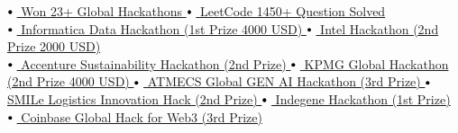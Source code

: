 \documentclass[letterpaper,10pt]{article}
\newcommand\sbullet[1][.5]{\mathbin{\vcenter{\hbox{\scalebox{#1}{$\bullet$}}}}}
\begin{document}
$\sbullet[.75] \hspace{0.1cm}${\href{https://www.hackerearth.com/@raj713335/}{ Won 23+ Global Hackathons \faExternalLink}} \hspace{4.4cm}
$\sbullet[.75] \hspace{0.1cm}${\href{https://leetcode.com/u/raj713335/}{ LeetCode 1450+ Question Solved \faExternalLink}} \\
$\sbullet[.75] \hspace{0.1cm}${\href{https://hack2skill.com/hack/informatica-deh-2024}{ Informatica Data Hackathon (1st Prize 4000 USD) \faExternalLink}} \hspace{1.05cm}
$\sbullet[.75] \hspace{0.1cm}${\href{https://www.hackerearth.com/challenges/hackathon/intel-oneapi-hackathon-for-open-innovation/}{ Intel Hackathon (2nd Prize 2000 USD) \faExternalLink}} \\
$\sbullet[.75] \hspace{0.1cm}${\href{https://www.hackerearth.com/challenges/hackathon/accenture-laterals-2/}{ Accenture Sustainability Hackathon (2nd Prize) \faExternalLink}} \hspace{1.5cm}
$\sbullet[.75] \hspace{0.1cm}${\href{https://www.hackerearth.com/challenges/hackathon/kpmgs-fullstack-azure-hiring-challenge/}{ KPMG Global Hackathon (2nd Prize 4000 USD) \faExternalLink}} \hspace{1.5cm}
$\sbullet[.75] \hspace{0.1cm}${\href{https://www.hackerearth.com/challenges/hackathon/atmecs-hackathon-2024/}{ ATMECS Global GEN AI Hackathon (3rd Prize) \faExternalLink}} \hspace{1.3cm}
$\sbullet[.75] \hspace{0.1cm}${\href{https://www.hackerearth.com/challenges/hackathon/smile-logistics-innovation-hack/}{ SMILe Logistics Innovation Hack (2nd Prize) \faExternalLink}} \hspace{1.6cm}
$\sbullet[.75] \hspace{0.1cm}${\href{https://www.hackerearth.com/challenges/hackathon/indegene-hackathon/}{ Indegene Hackathon (1st Prize) \faExternalLink}} \hspace{4.05cm}
$\sbullet[.75] \hspace{0.1cm}${\href{https://buidl-the-future.hackerearth.com/}{ Coinbase Global Hack for Web3 (3rd Prize) \faExternalLink}} \hspace{1.6cm}
\end{document}
